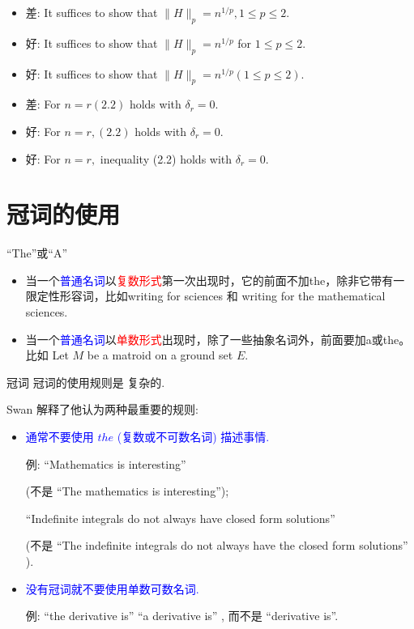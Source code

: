\documentclass{ctexbeamer}
\newcommand{\red}[1]{\textcolor{red}{#1}}
\newcommand{\blue}[1]{\textcolor{blue}{#1}}
\begin{document}
\begin{frame}
	\begin{itemize}
	\item 
差: It suffices to show that $\|H\|_{p}=n^{1 / p}, 1 \leqslant p \leqslant 2$. \pause
	\item 
好: It suffices to show that $\|H\|_{p}=n^{1 / p}$ for $1 \leqslant p \leqslant 2$. 
\item  
好: It suffices to show that $\|H\|_{p}=n^{1 / p}(1 \leqslant p \leqslant 2)$.
	\end{itemize}
\vspace{10pt}

\begin{itemize}
	\item 
差: For $n=r(2.2)$ holds with $\delta_{r}=0$. \pause
\item 
好: For $n=r,(2.2)$ holds with $\delta_{r}=0 .$ 
\item 
好: For $n=r,$ inequality (2.2) holds with $\delta_{r}=0$.
	\end{itemize}

\end{frame}
\section{{冠词}的使用}
\begin{frame}{``The''或``A''}
    
    \begin{itemize}
        \item  当一个\blue{普通名词}以\red{复数形式}第一次出现时，它的前面不加the，除非它带有一限定性形容词，比如writing for sciences 和 writing for the mathematical sciences.
        \item 当一个\blue{普通名词}以\red{单数形式}出现时，除了一些抽象名词外，前面要加a或the。
        比如   Let $M$ be a matroid on a ground set $E$.
        
    \end{itemize}
\end{frame}


\begin{frame}{冠词}
冠词的使用规则是 复杂的. 


{Swan} 解释了他认为两种最重要的规则:

\begin{itemize}
    \item \blue{通常不要使用 $t h e$ (复数或不可数名词) 描述事情. }
    
    例: ``Mathematics is interesting''
    
    (不是 ``The mathematics is interesting'');
    
    ``Indefinite integrals do not always have closed form solutions''
    
    (不是 ``The indefinite integrals do not always have the closed form solutions'' ).
    
    \item \blue{没有冠词就不要使用单数可数名词.}
    
    例: ``the derivative is'' ``a derivative is'' , 而不是 ``derivative is''.
\end{itemize}
\end{frame}
\end{document}
